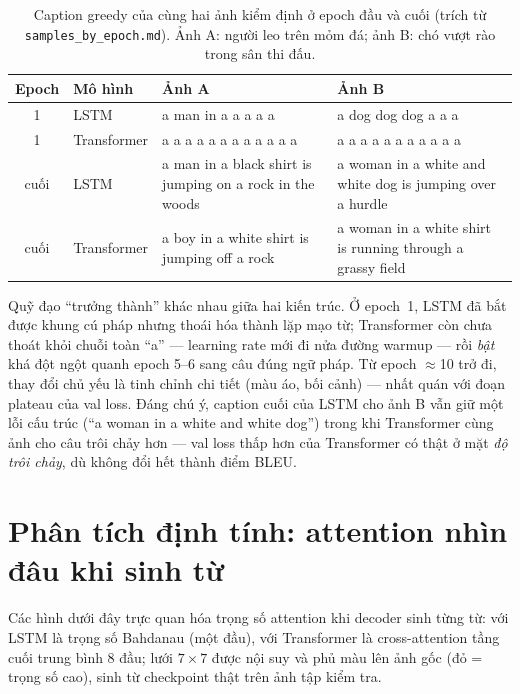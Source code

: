 \begin{table}[H]
	\centering
	\caption{Caption greedy của cùng hai ảnh kiểm định ở epoch đầu và cuối
	(trích từ \texttt{samples\_by\_epoch.md}). Ảnh A: người leo trên mỏm đá;
	ảnh B: chó vượt rào trong sân thi đấu.}
	\label{tab:samples-by-epoch}
	\small
	\begin{tabular}{clp{4.6cm}p{4.6cm}}
		\hline
		\textbf{Epoch} & \textbf{Mô hình} & \textbf{Ảnh A} & \textbf{Ảnh B} \\
		\hline
		1  & LSTM        & a man in a a a a a & a dog dog dog a a a \\
		1  & Transformer & a a a a a a a a a a a a & a a a a a a a a a a a \\
		\hline
		cuối & LSTM        & a man in a black shirt is jumping on a rock in the woods & a woman in a white and white dog is jumping over a hurdle \\
		cuối & Transformer & a boy in a white shirt is jumping off a rock & a woman in a white shirt is running through a grassy field \\
		\hline
	\end{tabular}
\end{table}

Quỹ đạo ``trưởng thành'' khác nhau giữa hai kiến trúc. Ở epoch~1, LSTM đã bắt
được khung cú pháp nhưng thoái hóa thành lặp mạo từ; Transformer còn chưa
thoát khỏi chuỗi toàn ``a'' --- learning rate mới đi nửa đường warmup --- rồi
\emph{bật} khá đột ngột quanh epoch 5--6 sang câu đúng ngữ pháp. Từ epoch
$\approx$10 trở đi, thay đổi chủ yếu là tinh chỉnh chi tiết (màu áo, bối cảnh)
--- nhất quán với đoạn plateau của val loss. Đáng chú ý, caption cuối của LSTM
cho ảnh B vẫn giữ một lỗi cấu trúc (``a woman in a white and white dog'') trong
khi Transformer cùng ảnh cho câu trôi chảy hơn --- val loss thấp hơn của
Transformer có thật ở mặt \emph{độ trôi chảy}, dù không đổi hết thành điểm BLEU.

\section{Phân tích định tính: attention nhìn đâu khi sinh từ}
\label{sec:qualitative}

Các hình dưới đây trực quan hóa trọng số attention khi decoder sinh từng từ:
với LSTM là trọng số Bahdanau (một đầu), với Transformer là cross-attention
tầng cuối trung bình 8 đầu; lưới $7\times7$ được nội suy và phủ màu lên ảnh
gốc (đỏ = trọng số cao), sinh từ checkpoint thật trên ảnh tập kiểm tra.

